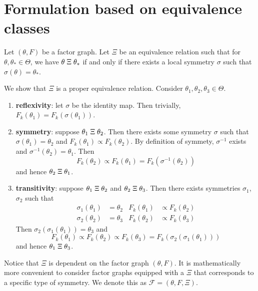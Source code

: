 

\section{Formulation based on equivalence classes}

Let $(\theta,F)$ be a factor graph. Let $\Xi$ be an equivalence relation such that for $\theta,\theta_*\in\Theta$, we have $\theta\;\Xi\;\theta_*$ if and only if there exists a local symmetry $\sigma$ such that $\sigma(\theta)=\theta_*$.

We show that $\Xi$ is a proper equivalence relation. Consider $\theta_1, \theta_2, \theta_3\in\Theta$.
\begin{enumerate}

\item
\textbf{reflexivity}: let $\sigma$ be the identity map. Then trivially, $F_k(\theta_1) = F_k(\sigma(\theta_1))$.

\item
\textbf{symmetry}: suppose $\theta_1\;\Xi\;\theta_2$. Then there exists some symmetry $\sigma$ such that $\sigma(\theta_1)=\theta_2$ and $F_k(\theta_1) \propto F_k(\theta_2)$. By definition of symmety, $\sigma^{-1}$ exists and $\sigma^{-1}(\theta_2)=\theta_1$. Then
\[
F_k(\theta_2) \propto F_k(\theta_1) = F_k(\sigma^{-1}(\theta_2))
\]
and hence $\theta_2\;\Xi\;\theta_1$.

\item
\textbf{transitivity}: suppose $\theta_1\;\Xi\;\theta_2$ and $\theta_2\;\Xi\;\theta_3$. Then there exists symmetries $\sigma_1$, $\sigma_2$ such that
\begin{align*}
\sigma_1(\theta_1)&=\theta_2 & F_k(\theta_1)&\propto F_k(\theta_2) \\
\sigma_2(\theta_2)&=\theta_3 & F_k(\theta_2)&\propto F_k(\theta_3)
\end{align*}
Then $\sigma_2(\sigma_1(\theta_1)) = \theta_3$ and
\[
F_k(\theta_1) \propto F_k(\theta_2) \propto F_k(\theta_3) = F_k(\sigma_2(\sigma_1(\theta_1)))
\]
and hence $\theta_1\;\Xi\;\theta_3$.

\end{enumerate}

Notice that $\Xi$ is dependent on the factor graph $(\theta,F)$. It is mathematically more convenient to consider factor graphs equipped with a $\Xi$ that corresponds to a specific type of symmetry. We denote this as $\mathcal{F}=(\theta,F,\Xi)$.

